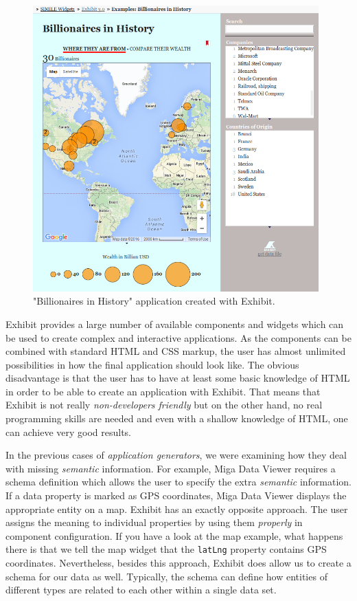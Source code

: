\begin{figure}
	\centering
	\includegraphics[width=110mm]{img/02_exhibit.png}
	\caption{"Billionaires in History" application \cite{exhibit_example} created with Exhibit.} 
	\label{fig:exhibit-map-example}
\end{figure}

Exhibit provides a large number of available components and widgets which can be used to create complex and interactive applications. As the components can be combined with standard HTML and CSS markup, the user has almost unlimited possibilities in how the final application should look like. The obvious disadvantage is that the user has to have at least some basic knowledge of HTML in order to be able to create an application with Exhibit. That means that Exhibit is not really \emph{non-developers friendly} but on the other hand, no real programming skills are needed and even with a shallow knowledge of HTML, one can achieve very good results.

In the previous cases of \emph{application generators}, we were examining how they deal with missing \emph{semantic} information. For example, Miga Data Viewer requires a schema definition which allows the user to specify the extra \emph{semantic} information. If a data property is marked as GPS coordinates, Miga Data Viewer displays the appropriate entity on a map. Exhibit has an exactly opposite approach. The user assigns the meaning to individual properties by using them \emph{properly} in component configuration. If you have a look at the map example, what happens there is that we tell the map widget that the \texttt{latLng} property contains GPS coordinates. Nevertheless, besides this approach, Exhibit does allow us to create a schema for our data as well. Typically, the schema can define how entities of different types are related to each other within a single data set.

